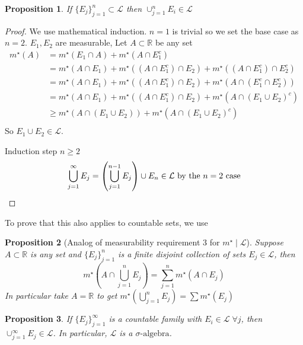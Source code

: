 \documentclass[11pt]{article}
\newtheorem*{prop}{Proposition}
\newcommand{\siga}{\sigma\text{-algebra}}
\newcommand{\mstar}[1]{m^{\star}\left(#1\right)}
\begin{document}
    \begin{prop}
        If $\{ E_j \}_{j=1}^{n} \subset \mathcal{L}$ then $\cup_{j=1}^{n} E_i \in \mathcal{L}$
    \end{prop}

    \begin{proof}
        We use mathematical induction.
        $n=1$ is trivial so we set the base case as $n=2$.
        $E_1, E_2$ are measurable, Let $A \subset \mathbb{R}$ be any set
        \begin{align*}
            \mstar{A} &= \mstar{E_1 \cap A} + \mstar{A \cap E_1 ^{c}} \\
            &= \mstar{A \cap E_1} + \mstar{(A \cap E_1^{c}) \cap E_2} + \mstar{(A \cap E_1 ^{c}) \cap E_2 ^{c}} \\
            &= \mstar{A \cap E_1} + \mstar{(A \cap E_1^{c}) \cap E_2} + \mstar{A \cap (E_1 ^{c} \cap E_2 ^{c})} \\
            &= \mstar{A \cap E_1} + \mstar{(A \cap E_1^{c}) \cap E_2} + \mstar{A \cap (E_1 \cup E_2)^{c}}\\
            &\geq \mstar{A \cap (E_1 \cup E_2)} + \mstar{A \cap (E_1 \cup E_2)^{c}} \tag{3w} \\
        \end{align*}
        So $E_1 \cup E_2 \in \mathcal{L}$.

        Induction step $n \geq 2$
        \[
            \bigcup_{j=1}^{\infty} E_j = \left( \bigcup_{j=1}^{n-1} E_j \right) \cup E_n \in \mathcal{L} \text{ by the $n=2$ case} \qedhere
        \]
    \end{proof}

    To prove that this also applies to countable sets, we use
    \begin{prop}[Analog of measurability requirement 3 for $m^{\star} \mid \mathcal{L}$]
        Suppose $A \subset \mathbb{R}$ is any set and $\{ E_j \}_{j=1}^{n}$ is a finite disjoint collection of sets $E_j \in \mathcal{L}$, then
    \[
        \mstar{A \cap \bigcup_{j=1}^{n} E_j} = \sum_{j=1}^{n} \mstar{A \cap E_j}
    \]
        In particular take $A = \mathbb{R}$ to get $\mstar{\bigcup_{j=1}^{n}E_j} = \sum \mstar{E_j}$
    \end{prop}

    \begin{prop}
        If $\{ E_j \}_{j=1}^{\infty}$ is a countable family with $E_i \in \mathcal{L} \; \forall j$, then $\cup_{j=1}^{\infty} E_j \in \mathcal{L}$.
        In particular, $\mathcal{L}$ is a $\siga$.
    \end{prop}
\end{document}
